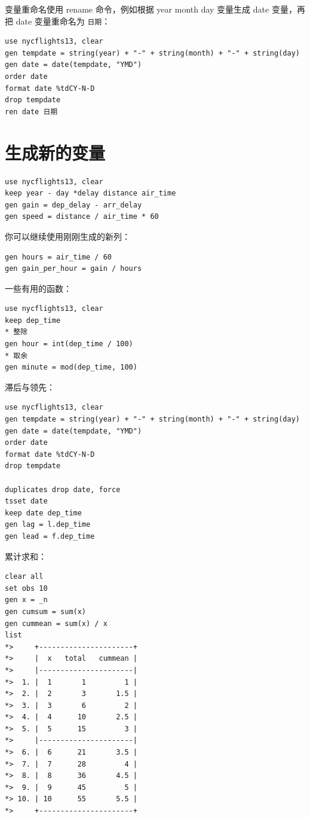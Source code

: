 \documentclass[]{ctexbook}
\begin{document}
变量重命名使用 rename 命令，例如根据 year month day 变量生成 date 变量，再把 date 变量重命名为 \texttt{日期}：

\begin{lstlisting}
use nycflights13, clear
gen tempdate = string(year) + "-" + string(month) + "-" + string(day)
gen date = date(tempdate, "YMD")
order date
format date %tdCY-N-D
drop tempdate
ren date 日期
\end{lstlisting}

\hypertarget{section-49}{%
\section{生成新的变量}\label{section-49}}

\begin{lstlisting}
use nycflights13, clear
keep year - day *delay distance air_time
gen gain = dep_delay - arr_delay
gen speed = distance / air_time * 60
\end{lstlisting}

你可以继续使用刚刚生成的新列：

\begin{lstlisting}
gen hours = air_time / 60
gen gain_per_hour = gain / hours
\end{lstlisting}

一些有用的函数：

\begin{lstlisting}
use nycflights13, clear
keep dep_time
* 整除
gen hour = int(dep_time / 100)
* 取余
gen minute = mod(dep_time, 100)
\end{lstlisting}

滞后与领先：

\begin{lstlisting}
use nycflights13, clear
gen tempdate = string(year) + "-" + string(month) + "-" + string(day)
gen date = date(tempdate, "YMD")
order date
format date %tdCY-N-D
drop tempdate

duplicates drop date, force
tsset date
keep date dep_time
gen lag = l.dep_time
gen lead = f.dep_time
\end{lstlisting}

累计求和：

\begin{lstlisting}
clear all
set obs 10
gen x = _n
gen cumsum = sum(x)
gen cummean = sum(x) / x
list
*>     +----------------------+
*>     |  x   total   cummean |
*>     |----------------------|
*>  1. |  1       1         1 |
*>  2. |  2       3       1.5 |
*>  3. |  3       6         2 |
*>  4. |  4      10       2.5 |
*>  5. |  5      15         3 |
*>     |----------------------|
*>  6. |  6      21       3.5 |
*>  7. |  7      28         4 |
*>  8. |  8      36       4.5 |
*>  9. |  9      45         5 |
*> 10. | 10      55       5.5 |
*>     +----------------------+
\end{lstlisting}
\end{document}
